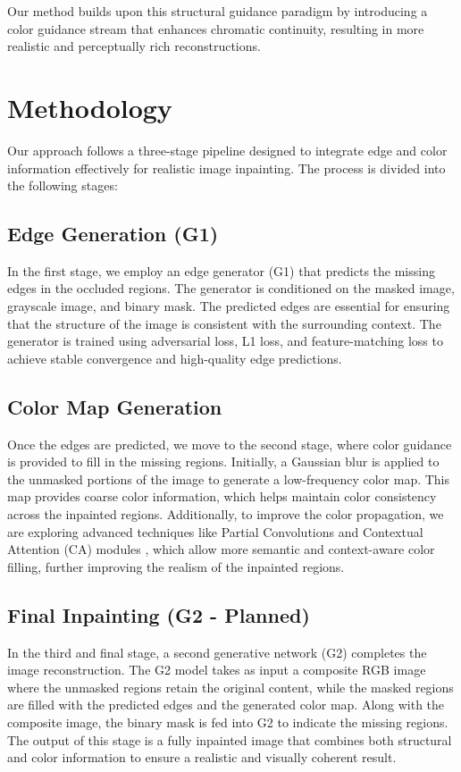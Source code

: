 \documentclass[10pt,twocolumn,letterpaper]{article}
\begin{document}
Our method builds upon this structural guidance paradigm by introducing a color guidance stream that enhances chromatic continuity, resulting in more realistic and perceptually rich reconstructions.


\section{Methodology}

Our approach follows a three-stage pipeline designed to integrate edge and color information effectively for realistic image inpainting. The process is divided into the following stages:

\subsection{Edge Generation (G1)} In the first stage, we employ an edge generator (G1) that predicts the missing edges in the occluded regions. The generator is conditioned on the masked image, grayscale image, and binary mask. The predicted edges are essential for ensuring that the structure of the image is consistent with the surrounding context. The generator is trained using adversarial loss, L1 loss, and feature-matching loss to achieve stable convergence and high-quality edge predictions.

\subsection{Color Map Generation} Once the edges are predicted, we move to the second stage, where color guidance is provided to fill in the missing regions. Initially, a Gaussian blur is applied to the unmasked portions of the image to generate a low-frequency color map. This map provides coarse color information, which helps maintain color consistency across the inpainted regions. Additionally, to improve the color propagation, we are exploring advanced techniques like Partial Convolutions \cite{liu2018partial} and Contextual Attention (CA) modules \cite{yu2018generative}, which allow more semantic and context-aware color filling, further improving the realism of the inpainted regions.

\subsection{Final Inpainting (G2 - Planned)} In the third and final stage, a second generative network (G2) completes the image reconstruction. The G2 model takes as input a composite RGB image where the unmasked regions retain the original content, while the masked regions are filled with the predicted edges and the generated color map. Along with the composite image, the binary mask is fed into G2 to indicate the missing regions. The output of this stage is a fully inpainted image that combines both structural and color information to ensure a realistic and visually coherent result.
\end{document}
